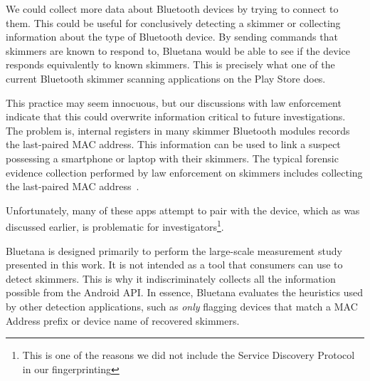 We could collect more data about Bluetooth devices by trying to connect to
them.
%
This could be useful for conclusively detecting a skimmer or collecting information
about the type of Bluetooth device.
%
By sending commands that skimmers are known to respond to, Bluetana would be able to
see if the device responds equivalently to known skimmers. 
%
This is precisely what one of the current Bluetooth skimmer scanning applications on
the Play Store does.

This practice may seem innocuous, but our discussions with law enforcement
indicate that this could overwrite information critical to future
investigations.
%
The problem is, internal registers in many skimmer Bluetooth modules records the
last-paired MAC address.
%
This information can be used to link a suspect possessing a smartphone or
laptop with their skimmers.
%
The typical forensic evidence collection performed by law enforcement on
skimmers includes collecting the last-paired MAC address~\cite{swgdepractices}. 



%
%


%

%



%
Unfortunately, many of these apps attempt to pair with the device, which as was
discussed earlier, is problematic for investigators\footnote{This is one of the
reasons we did not include the Service Discovery Protocol in our
fingerprinting}.

Bluetana is designed primarily to perform the large-scale measurement study
presented in this work. It is not intended as a tool that consumers can use to
detect skimmers. 
%
This is why it indiscriminately collects all the information possible from the
Android API.
%
In essence, Bluetana evaluates the heuristics used by other detection applications,
such as \emph{only} flagging devices that match a MAC Address prefix or device name of
recovered skimmers.
%


